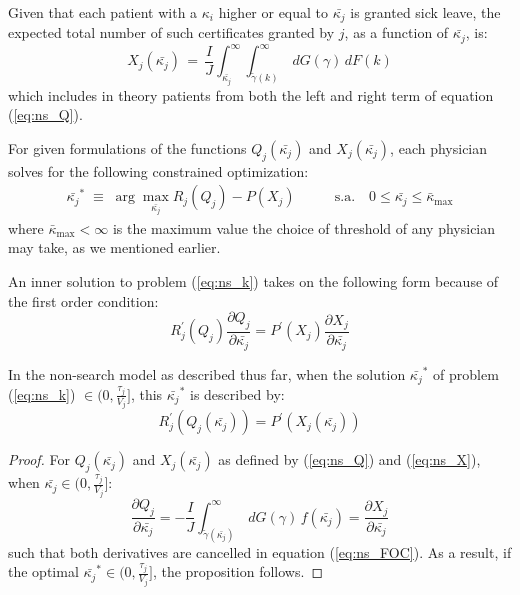 \documentclass[../main.tex]{subfiles}
\begin{document}
Given that each patient with a $\kappa_i$ higher or equal to $\bar{\kappa_j}$ is granted sick leave, the expected total number of such certificates granted by $j$, as a function of $\bar{\kappa_j}$, is:
\begin{equation}
    X_j(\bar{\kappa_j}) \,=\, \frac{I}{J} \int_{\bar{\kappa_j}}^{\infty} \int_{\tilde{\gamma}(k)}^{\infty} \,dG(\gamma) \,dF(k)
   \label{eq:ns_X}
\end{equation}
which includes in theory patients from both the left and right term of equation (\ref{eq:ns_Q}).

For given formulations of the functions $Q_j(\bar{\kappa_j})$ and $X_j(\bar{\kappa_j})$, each physician solves for the following constrained optimization:
\begin{align}
\bar{\kappa_j}^* \; \equiv \; \operatorname{arg}\max_{\bar{\kappa_j}} R_j(Q_j) - P(X_j) & \hspace{2em} \text{s.a.} \hspace{1em} 0 \leq \bar{\kappa_j} \leq \bar{\kappa}_{\max}
\label{eq:ns_k}
\end{align}
where $\bar{\kappa}_{\max} < \infty$ is the maximum value the choice of threshold of any physician may take, as we mentioned earlier.

An inner solution to problem (\ref{eq:ns_k}) takes on the following form because of the first order condition:
\begin{equation}
    R_j^{\prime}(Q_j)\frac{\partial Q_j}{\partial\bar{\kappa_j}}  = P^{\prime}(X_j)\frac{\partial X_j}{\partial \bar{\kappa_j}}
\label{eq:ns_FOC}
\end{equation}

\vspace{0.5em}

\begin{prop}
    \label{ns_prop}
In the non-search model as described thus far, when the solution $\bar{\kappa_j}^*$ of problem (\ref{eq:ns_k}) $\in (0,\frac{\tau_j}{V_j}]$, this $\bar{\kappa_j}^*$ is described by: 
\begin{equation*}
    R_j^{\prime}(Q_j(\bar{\kappa_j}))  = P^{\prime}(X_j(\bar{\kappa_j}))
\end{equation*}
\end{prop}

\begin{proof}
For $Q_j(\bar{\kappa_j})$ and $X_j(\bar{\kappa_j})$ as defined by (\ref{eq:ns_Q}) and (\ref{eq:ns_X}), when $\bar{\kappa_j} \in (0,\frac{\tau_j}{V_j}]$:
\[
\frac{\partial Q_j}{\partial\bar{\kappa_j}} = - \frac{I}{J} \int_{\tilde{\gamma}(\bar{\kappa_j})}^{\infty} \,dG(\gamma) \,f(\bar{\kappa_j}) = \frac{\partial X_j}{\partial\bar{\kappa_j}}
\]
such that both derivatives are cancelled in equation (\ref{eq:ns_FOC}). As a result, if the optimal $\bar{\kappa_j}^* \in (0,\frac{\tau_j}{V_j}]$, the proposition follows.
\end{proof}
\end{document}
